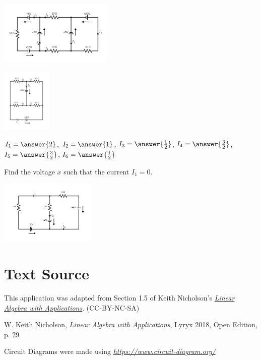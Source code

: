 \documentclass{ximera}
\begin{document}
\begin{problem}\label{prob:circuit4}
\begin{image}
   
\includegraphics[height=1.2in]{circuit4.jpg}~
 
\end{image}
\end{problem}

\begin{problem}\label{prob:circuit5}

\begin{image}
   
\includegraphics[height=1.2in]{circuit5.jpg}~
 
\end{image}

$ I_1 = \answer{2}$, $I_2 = \answer{1}$, $I_3 = \answer{\frac{1}{2}}$, $I_4 = \answer{\frac{3}{2}}$, $I_5 = \answer{\frac{3}{2}}$, $I_6 = \answer{\frac{1}{2}}$

\end{problem}

\begin{problem}\label{prob:circuit6}

Find the voltage $x$ such that the current $I_1 = 0$.

\begin{image}
   
\includegraphics[height=1.2in]{circuit6.jpg}~
 
\end{image}
\end{problem}

\section*{Text Source} This application was adapted from Section 1.5 of Keith Nicholson's \href{https://open.umn.edu/opentextbooks/textbooks/linear-algebra-with-applications}{\it Linear Algebra with Applications}. (CC-BY-NC-SA)

W. Keith Nicholson, {\it Linear Algebra with Applications}, Lyryx 2018, Open Edition, p. 29 

Circuit Diagrams were made using \href{https://www.circuit-diagram.org/}{\it https://www.circuit-diagram.org/}
\end{document}
